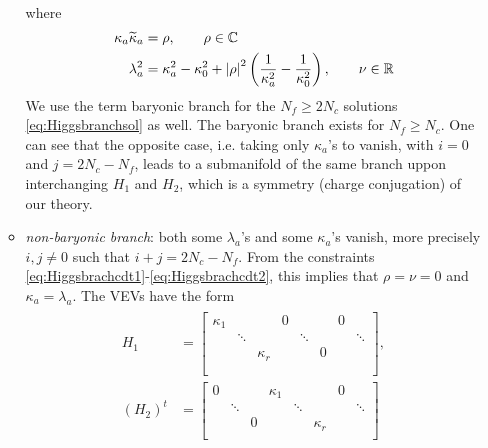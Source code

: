 \begin{itemize}
\begin{itemize}[label=$\triangleright$]
\begin{align}
\begin{split}
                    \end{split}\label{eq:barynoicbranch}
                    \end{align}
                    where
                    \begin{align}
                        \kappa_a\widetilde{\kappa}_a &= \rho,\qquad\rho\in\mathbb{C}\\
                        \lambda^2_a &= \kappa^2_a-\kappa^2_0+\abs{\rho}^2\left(\frac{1}{\kappa^2_a}-\frac{1}{\kappa^2_0}\right),\qquad\nu\in\mathbb{R} 
                    \end{align}
                    We use the term baryonic branch for the $N_f\geq 2N_c$ solutions \eqref{eq:Higgsbranchsol} as well. The baryonic branch exists for $N_f\geq N_c$.  One can see that the opposite case, i.e. taking only $\kappa_a$'s to vanish, with $i=0$ and $j=2N_c-N_f$, leads to a submanifold of the same branch uppon interchanging $H_1$ and $H_2$, which is a symmetry (charge conjugation) of our theory.
                    \item \emph{non-baryonic branch}: both some $\lambda_a$'s and some $\kappa_a$'s vanish, more precisely $i,j\neq0$ such that $i+j=2N_c-N_f$. From the constraints \eqref{eq:Higgsbrachcdt1}-\eqref{eq:Higgsbrachcdt2}, this implies that $\rho=\nu=0$ and $\kappa_a=\lambda_a$. The VEVs have the form
                    \begin{align}
                        \begin{split}
                            H_1 &= 
                            \begin{bmatrix}
                                \kappa_1 & & & 0 & & & 0 & \\
                                & \ddots & & & \ddots & & & \ddots \\
                                & & \kappa_r & & & 0 & & \\
                                & & & & & & & \\
                                & & & & & & &
                            \end{bmatrix},\\
                            (H_2)^t &= 
                            \begin{bmatrix}
                                0 & & & \kappa_1 & & & 0 & \\
                                & \ddots & & & \ddots & & & \ddots \\
                                & & 0 & & & \kappa_r & & \\

\end{bmatrix}
\end{split}
\end{align}
\end{itemize}
\end{itemize}
